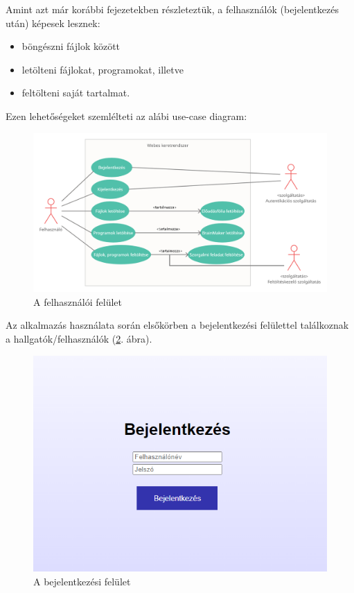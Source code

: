 Amint azt már korábbi fejezetekben részleteztük, a felhasználók (bejelentkezés után) képesek lesznek:

\begin{itemize}
\item{böngészni fájlok között}
\item{letölteni fájlokat, programokat, illetve}
\item{feltölteni saját tartalmat.}
\end{itemize}

Ezen lehetőségeket szemlélteti az alábi use-case diagram:

\begin{figure}[h]
	\centering
		\includegraphics[width=10truecm, height=7truecm]{images/felhasznalo_use_case.png}
	\caption{A felhasználói felület}
	\label{fig:login}
\end{figure}

Az alkalmazás használata során elsőkörben a bejelentkezési felülettel találkoznak a hallgatók/felhasználók (\ref{fig:login}. ábra). 

\begin{figure}[h]
	\centering
		\includegraphics[width=10truecm, height=7truecm]{images/bejelentkezes.png}
	\caption{A bejelentkezési felület}
	\label{fig:login}
\end{figure}

